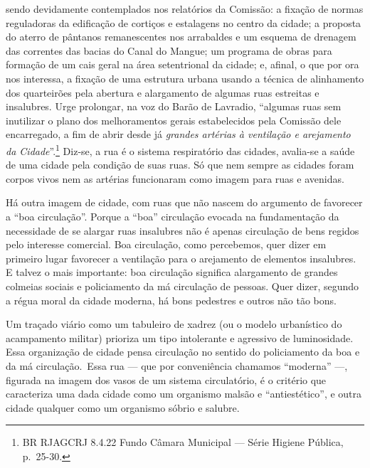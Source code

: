 sendo devidamente contemplados nos relatórios da Comissão: a fixação de
normas reguladoras da edificação de cortiços e estalagens no centro da
cidade; a proposta do aterro de pântanos remanescentes nos arrabaldes e
um esquema de drenagem das correntes das bacias do Canal do Mangue; um
programa de obras para formação de um cais geral na área setentrional da
cidade; e, afinal, o que por ora nos interessa, a fixação de uma
estrutura urbana usando a técnica de alinhamento dos quarteirões pela
abertura e alargamento de algumas ruas estreitas e insalubres. Urge
prolongar, na voz do Barão de Lavradio, ``algumas ruas sem inutilizar o
plano dos melhoramentos gerais estabelecidos pela Comissão dele
encarregado, a fim de abrir desde já \textit{grandes artérias à ventilação
e arejamento da Cidade}''.\footnote{BR RJAGCRJ 8.4.22 Fundo Câmara
  Municipal --- Série Higiene Pública, p.~25-30.} Diz-se, a rua é o
sistema respiratório das cidades, avalia-se a saúde de uma cidade pela
condição de suas ruas. Só que nem sempre as cidades foram corpos vivos
nem as artérias funcionaram como imagem para ruas e avenidas.

Há outra imagem de cidade, com ruas que não nascem do argumento de
favorecer a ``boa circulação''. Porque a ``boa'' circulação evocada na
fundamentação da necessidade de se alargar ruas insalubres não é apenas
circulação de bens regidos pelo interesse comercial. Boa circulação,
como percebemos, quer dizer em primeiro lugar favorecer a ventilação
para o arejamento de elementos insalubres. E talvez o mais importante:
boa circulação significa alargamento de grandes colmeias sociais e
policiamento da má circulação de pessoas. Quer dizer, segundo a régua
moral da cidade moderna, há bons pedestres e outros não tão bons.

Um traçado viário como um tabuleiro de xadrez (ou o modelo urbanístico
do acampamento militar) prioriza um tipo intolerante e agressivo de
luminosidade. Essa organização de cidade pensa circulação no sentido do
policiamento da boa e da má circulação.~Essa rua --- que por conveniência
chamamos ``moderna'' ---, figurada na imagem dos vasos de um sistema
circulatório, é o critério que caracteriza uma dada cidade como um
organismo malsão e ``antiestético'', e outra cidade qualquer como um
organismo sóbrio e salubre.

